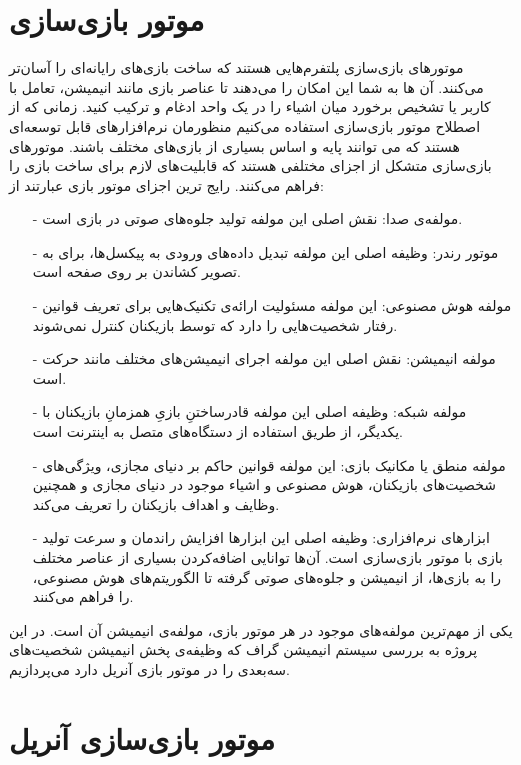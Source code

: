 
\section{موتور بازی‌سازی}
موتور‌های بازی‌سازی پلتفرم‌هایی هستند که ساخت بازی‌های رایانه‌ای را آسان‌تر می‌کنند.
آن ها به شما این امکان را می‌دهند تا عناصر بازی مانند انیمیشن، تعامل با کاربر یا تشخیص برخورد میان اشیاء را در یک واحد ادغام و ترکیب کنید.
\cite{barczak2019comparative}
زمانی که از اصطلاح موتور بازی‌سازی استفاده می‌کنیم منظورمان نرم‌افزارهای قابل توسعه‌ای هستند که می توانند پایه و اساس بسیاری از بازی‌های مختلف باشند.
\cite{GameEngineArchitecture}
موتورهای بازی‌سازی متشکل از اجزای مختلفی هستند که قابلیت‌های لازم برای ساخت بازی را فراهم می‌کنند.
رایج ترین اجزای موتور بازی عبارتند از:
\cite{barczak2019comparative}
\begin{itemize}
    \item[-] مولفه‌ی صدا: نقش اصلی این مولفه تولید جلوه‌های صوتی در بازی است.
    \item[-] موتور رندر: وظیفه اصلی این مولفه تبدیل داده‌های ورودی به پیکسل‌ها، برای به تصویر کشاندن بر روی صفحه است.
    \item[-] مولفه هوش مصنوعی: این مولفه مسئولیت ارائه‌ی تکنیک‌هایی برای تعریف قوانین رفتار شخصیت‌هایی را دارد که توسط بازیکنان کنترل نمی‌شوند.
    \item[-] مولفه انیمیشن: نقش اصلی این مولفه اجرای انیمیشن‌های مختلف مانند حرکت است.
    \item[-] مولفه شبکه: وظیفه اصلی این مولفه قادرساختنِ بازیِ همزمانِ بازیکنان با یکدیگر، از طریق استفاده از دستگاه‌های متصل به اینترنت است.
    \item[-] مولفه منطق یا مکانیک بازی: این مولفه قوانین حاکم بر دنیای مجازی، ویژگی‌های شخصیت‌های بازیکنان، هوش مصنوعی و اشیاء موجود در دنیای مجازی و همچنین وظایف و اهداف بازیکنان را تعریف می‌کند.
    \item[-] ابزارهای نرم‌افزاری: وظیفه اصلی این ابزارها افزایش راندمان و سرعت تولید بازی با موتور بازی‌سازی است. آن‌ها توانایی اضافه‌کردن بسیاری از عناصر مختلف را به بازی‌ها، از انیمیشن و جلوه‌های صوتی گرفته تا الگوریتم‌های هوش مصنوعی، را فراهم می‌کنند.   
\end{itemize}

یکی از مهم‌ترین مولفه‌های موجود در هر موتور بازی، مولفه‌ی انیمیشن آن است. در این پروژه به بررسی سیستم
انیمیشن گراف که وظیفه‌ی پخش انیمیشن‌ شخصیت‌های سه‌بعدی را در موتور بازی آنریل دارد می‌پردازیم.



\section {موتور بازی‌سازی آنریل}

